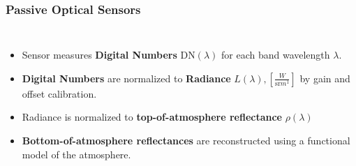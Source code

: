 \documentclass[%
  aspectratio=169,
  9pt,
  USenglish,
  titlegraphic, %
  affiliationintitlepagehead,
  affiliation,
]{beamer}
\begin{document}
%
\begin{frame}
\frametitle{Passive Optical Sensors}
\begin{columns}
	
	
	\begin{itemize}[itemsep=.5em]
		\item<1-> Sensor measures \textbf{Digital Numbers} $\text{DN}(\lambda)$ for each band wavelength $\lambda$. 
		\item<2-> \textbf{Digital Numbers} are normalized to \textbf{Radiance} 
		$L(\lambda), \left[\frac{W}{\text{sr}m^1}\right]$ by gain and offset calibration.
		\item<4-> Radiance is normalized to \textbf{top-of-atmosphere reflectance} $\rho(\lambda)$
		\item<4-> \textbf{Bottom-of-atmosphere reflectances} are reconstructed using a functional model of the atmosphere.
	\end{itemize}
	
	
	
	
	
\end{columns}
\end{frame}
\end{document}
